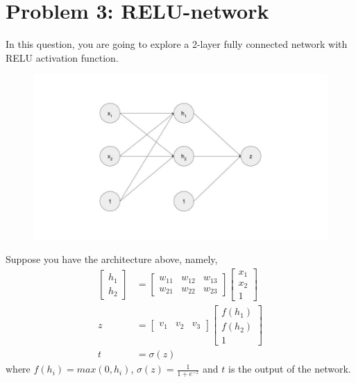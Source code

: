 \documentclass{article}
\begin{document}
    \section*{Problem 3: RELU-network}
    In this question, you are going to explore a 2-layer
    fully connected network with RELU activation function. 
    \begin{figure}[h!]
        \includegraphics[width=\textwidth]{nn.jpg}
    \end{figure}
    \newline
    Suppose you have the architecture above, namely, 
    \begin{align*}
        \begin{bmatrix}h_1 \\ h_2 \end{bmatrix} &= \begin{bmatrix}w_{11} & w_{12} & w_{13} \\w_{21} & w_{22} & w_{23}\end{bmatrix} \begin{bmatrix} x_1 \\ x_2 \\ 1\end{bmatrix} \\
        z &= \begin{bmatrix} v_1 & v_2 & v_3\end{bmatrix} \begin{bmatrix}
        f(h_1) \\ f(h_2) \\ 1 
        \end{bmatrix}  \\
        t &= \sigma(z) 
    \end{align*}
    where $f(h_i) = max(0, h_i)$, $\sigma(z) = \frac{1}{1 + e^{-z}}$ and $t$ is the output of the network.
\end{document}
